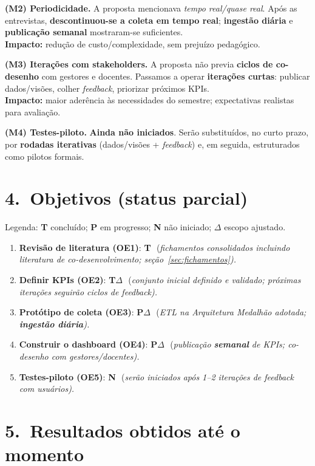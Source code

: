 \documentclass[
	12pt,
	openright,
	oneside,
	a4paper,
	brazil
]{abntex2}
\begin{document}
\textbf{(M2) Periodicidade.} A proposta mencionava \emph{tempo real/quase real}. Após as entrevistas, \textbf{descontinuou-se a coleta em tempo real}; \textbf{ingestão diária} e \textbf{publicação semanal} mostraram-se suficientes. \\
\textbf{Impacto:} redução de custo/complexidade, sem prejuízo pedagógico.

\textbf{(M3) Iterações com stakeholders.} A proposta não previa \textbf{ciclos de co-desenho} com gestores e docentes. Passamos a operar \textbf{iterações curtas}: publicar dados/visões, colher \textit{feedback}, priorizar próximos KPIs. \\
\textbf{Impacto:} maior aderência às necessidades do semestre; expectativas realistas para avaliação.

\textbf{(M4) Testes-piloto.} \textbf{Ainda não iniciados}. Serão substituídos, no curto prazo, por \textbf{rodadas iterativas} (dados/visões + \textit{feedback}) e, em seguida, estruturados como pilotos formais.

\section*{4.\ Objetivos (status parcial)}
{\footnotesize Legenda: \textbf{T} concluído; \textbf{P} em progresso; \textbf{N} não iniciado; \textbf{$\Delta$} escopo ajustado.}
\begin{enumerate}
    \item \textbf{Revisão de literatura (OE1)}: \textbf{T} \,\,(\em fichamentos consolidados incluindo literatura de co-desenvolvimento; seção~\ref{sec:fichamentos}). 
    \item \textbf{Definir KPIs (OE2)}: \textbf{T}$\Delta$ \,\,(\em conjunto inicial definido e validado; próximas iterações seguirão ciclos de \textit{feedback}). 
    \item \textbf{Protótipo de coleta (OE3)}: \textbf{P}$\Delta$ \,\,(\em ETL na Arquitetura Medalhão adotada; \textbf{ingestão diária}). 
    \item \textbf{Construir o dashboard (OE4)}: \textbf{P}$\Delta$ \,\,(\em publicação \textbf{semanal} de KPIs; co-desenho com gestores/docentes). 
    \item \textbf{Testes-piloto (OE5)}: \textbf{N} \,\,(\em serão iniciados após 1--2 iterações de \textit{feedback} com usuários).
\end{enumerate}

\section*{5.\ Resultados obtidos até o momento}
\end{document}
